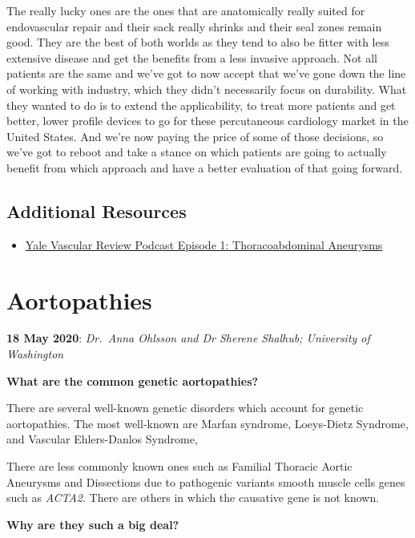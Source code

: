 \documentclass[
]{book}
\providecommand{\tightlist}{%
  \setlength{\itemsep}{0pt}\setlength{\parskip}{0pt}}
\begin{document}
The really lucky ones are the ones that are anatomically really suited
for endovascular repair and their sack really shrinks and their seal
zones remain good. They are the best of both worlds as they tend to also
be fitter with less extensive disease and get the benefits from a less
invasive approach. Not all patients are the same and we've got to now
accept that we've gone down the line of working with industry, which
they didn't necessarily focus on durability. What they wanted to do is
to extend the applicability, to treat more patients and get better,
lower profile devices to go for these percutaneous cardiology market in
the United States. And we're now paying the price of some of those
decisions, so we've got to reboot and take a stance on which patients
are going to actually benefit from which approach and have a better
evaluation of that going forward.

\hypertarget{additional-resources}{%
\subsection{Additional Resources}\label{additional-resources}}

\begin{itemize}
\tightlist
\item
  \href{https://podcasts.apple.com/us/podcast/yale-vascular-review/id1587352652}{Yale Vascular Review Podcast Episode 1: Thoracoabdominal
  Aneurysms}
\end{itemize}

\hypertarget{aortopathies}{%
\section{Aortopathies}\label{aortopathies}}

\textbf{18 May 2020}: \emph{Dr.~Anna Ohlsson and Dr Sherene Shalhub; University of
Washington}

\textbf{What are the common genetic aortopathies?}

There are several well-known genetic disorders which account for genetic
aortopathies. The most well-known are Marfan syndrome, Loeys-Dietz
Syndrome, and Vascular Ehlers-Danlos Syndrome,

There are less commonly known ones such as Familial Thoracic Aortic
Aneurysms and Dissections due to pathogenic variants smooth muscle cells
genes such as \emph{ACTA2}. There are others in which the causative gene is
not known.

\textbf{Why are they such a big deal?}
\end{document}
